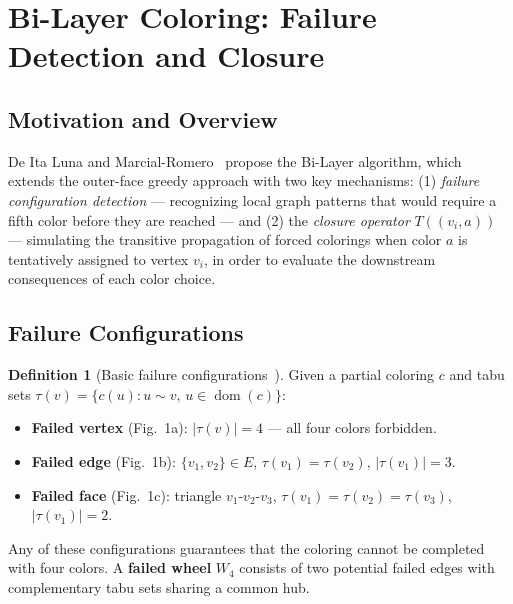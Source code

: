 \documentclass[12pt,letterpaper]{article}
\theoremstyle{plain}
\theoremstyle{definition}
\newtheorem{definition}[theorem]{Definition}
\theoremstyle{remark}
\newcommand{\dom}{\operatorname{dom}}
\begin{document}
\section{Bi-Layer Coloring: Failure Detection and Closure}
\label{sec:bilayer}

\subsection{Motivation and Overview}

De Ita Luna and Marcial-Romero~\cite{deita2024} propose the Bi-Layer algorithm,
which extends the outer-face greedy approach with two key mechanisms: (1)
\emph{failure configuration detection} — recognizing local graph patterns that
would require a fifth color before they are reached — and (2) the \emph{closure
operator} $T((v_i, a))$ — simulating the transitive propagation of forced
colorings when color $a$ is tentatively assigned to vertex $v_i$, in order to
evaluate the downstream consequences of each color choice.

\subsection{Failure Configurations}

\begin{definition}[Basic failure configurations~\cite{deita2024}]
Given a partial coloring $c$ and tabu sets $\tau(v) = \{c(u) : u \sim v,\,
u \in \dom(c)\}$:
\begin{itemize}[noitemsep]
    \item \textbf{Failed vertex} (Fig.~1a): $|\tau(v)| = 4$ — all four colors forbidden.
    \item \textbf{Failed edge} (Fig.~1b): $\{v_1, v_2\} \in E$,
        $\tau(v_1) = \tau(v_2)$, $|\tau(v_1)| = 3$.
    \item \textbf{Failed face} (Fig.~1c): triangle $v_1$-$v_2$-$v_3$,
        $\tau(v_1) = \tau(v_2) = \tau(v_3)$, $|\tau(v_1)| = 2$.
\end{itemize}
\end{definition}

Any of these configurations guarantees that the coloring cannot be completed
with four colors. A \textbf{failed wheel} $W_4$ consists of two potential
failed edges with complementary tabu sets sharing a common hub.
\end{document}
